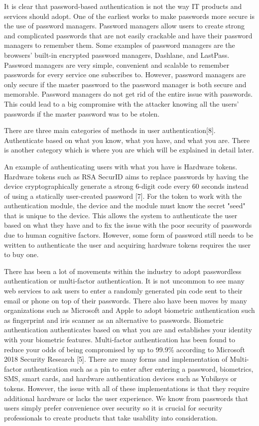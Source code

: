 \documentclass[letterpaper,twocolumn,10pt]{article}
\begin{document}
It is clear that password-based authentication is not the way IT products and services should adopt. One of the earliest works to make passwords more secure is the use of password managers. Password managers allow users to create strong and complicated passwords that are not easily crackable and have their password managers to remember them. Some examples of password managers are the browsers' built-in encrypted password managers, Dashlane, and LastPass. Password managers are very simple, convenient and scalable to remember passwords for every service one subscribes to. However, password managers are only secure if the master password to the password manager is both secure and memorable. Password managers do not get rid of the entire issue with passwords. This could lead to a big compromise with the attacker knowing all the users' passwords if the master password was to be stolen.

There are three main categories of methods in user authentication[8]. Authenticate based on what you know, what you have, and what you are. There is another category which is where you are which will be explained in detail later.

An example of authenticating users with what you have is Hardware tokens. Hardware tokens such as RSA SecurID aims to replace passwords by having the device cryptographically generate a strong 6-digit code every 60 seconds instead of using a statically user-created password [7]. For the token to work with the authentication module, the device and the module must know the secret "seed" that is unique to the device. This allows the system to authenticate the user based on what they have and to fix the issue with the poor security of passwords due to human cognitive factors. However, some form of password still needs to be written to authenticate the user and acquiring hardware tokens requires the user to buy one.

There has been a lot of movements within the industry to adopt passwordless authentication or multi-factor authentication. It is not uncommon to see many web services to ask users to enter a randomly generated pin code sent to their email or phone on top of their passwords. There also have been moves by many organizations such as Microsoft and Apple to adopt biometric authentication such as fingerprint and iris scanner as an alternative to passwords. Biometric authentication authenticates based on what you are and establishes your identity with your biometric features. Multi-factor authentication has been found to reduce your odds of being compromised by up to 99.9\% according to Microsoft 2018 Security Research [5]. There are many forms and implementation of Multi-factor authentication such as a pin to enter after entering a password, biometrics, SMS, smart cards, and hardware authentication devices such as Yubikeys or tokens. However, the issue with all of these implementations is that they require additional hardware or lacks the user experience. We know from passwords that users simply prefer convenience over security so it is crucial for security professionals to create products that take usability into consideration. 
\end{document}
